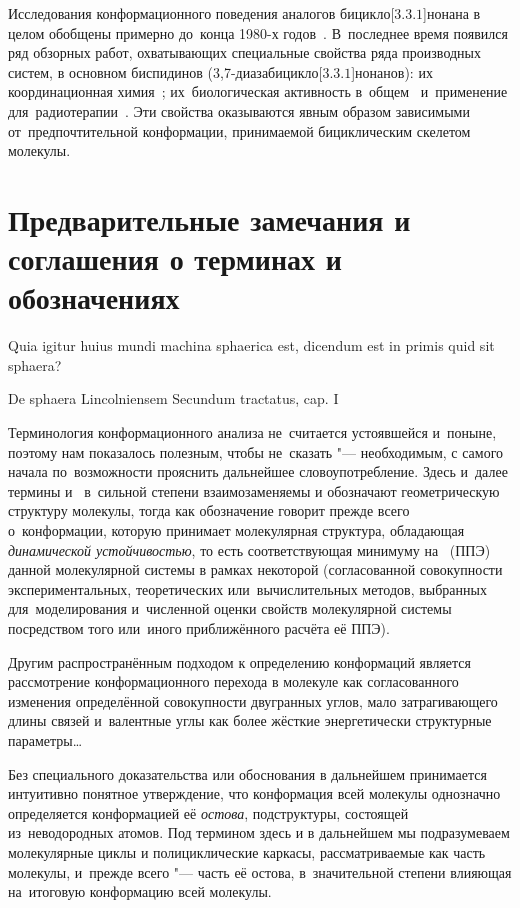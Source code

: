Исследования конформационного поведения аналогов бицикло[$3.3.1$]\-нонана в целом обобщены примерно до~конца 1980-х годов~\cite{Zefirov:1991a}. В~последнее время появился ряд обзорных работ, охватывающих специальные свойства ряда производных систем, в основном биспидинов (3,7-диазабицикло[$3.3.1$]нонанов): их координационная химия~\cite{Comba:2007}; их~биологическая активность в~общем~\cite{Tomassoli:2016} и~применение для~радиотерапии~\cite{Comba:2018}. Эти свойства оказываются явным образом зависимыми от~предпочтительной конформации, принимаемой бициклическим скелетом молекулы.

\section{Предварительные замечания и соглашения о терминах и обозначениях}

\epigraph{Quia igitur huius mundi machina sphaerica est, dicendum est in primis quid sit sphaera?}{De sphaera Lincolniensem Secundum tractatus, cap. I}

Терминология конформационного анализа не~считается устоявшейся и~поныне, поэтому нам показалось полезным, чтобы не~сказать "--- необходимым, с самого начала по~возможности прояснить дальнейшее словоупотребление. Здесь и~далее термины  и~ в~сильной степени взаимозаменяемы и обозначают геометрическую структуру молекулы, тогда как обозначение  говорит прежде всего о~конформации, которую принимает молекулярная структура, обладающая \emph{динамической устойчивостью}, то есть соответствующая минимуму на~ (ППЭ) данной молекулярной системы в рамках некоторой  (согласованной совокупности экспериментальных, теоретических или~вычислительных методов, выбранных для~моделирования и~численной оценки свойств молекулярной системы посредством того или~иного приближённого расчёта её ППЭ). 

Другим распространённым подходом к определению конформаций является рассмотрение конформационного перехода в молекуле как согласованного изменения определённой совокупности двугранных углов, мало затрагивающего длины связей и~валентные углы как более жёсткие энергетически структурные параметры\dots

Без специального доказательства или обоснования в дальнейшем принимается интуитивно понятное утверждение, что конформация всей молекулы однозначно определяется конформацией её \emph{остова}, подструктуры, состоящей из~неводородных атомов.
Под термином  здесь и в дальнейшем мы подразумеваем молекулярные циклы и полициклические каркасы, рассматриваемые как часть молекулы, и~прежде всего "--- часть её остова, в~значительной степени влияющая на~итоговую конформацию всей молекулы.

